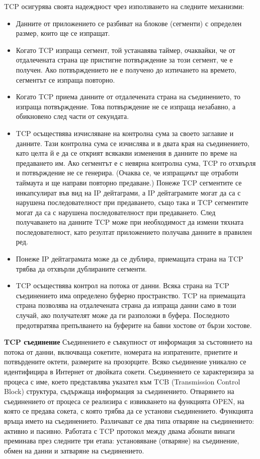 \documentclass{article}
\begin{document}
TCP осигурява своята надеждност чрез използването на следните механизми:
\begin{itemize}
    \item Данните от приложението се разбиват на блокове (сегменти) с определен размер, които ще се изпращат.
    \item Когато TCP изпраща сегмент, той устанавява таймер, очаквайки, че от отдалечената страна ще пристигне потвърждение за
    този сегмент, че е получен. Ако потвърждението не е получено до изтичането на времето, сегментът се изпраща повторно.
    \item Когато TCP приема данните от отдалечената страна на съединението, то изпраща потвърждение. Това потвърждение не се
    изпраща незабавно, а обикновено след части от секундата.
    \item TCP осъществява изчисляване на контролна сума за своето заглавие и данните. Тази контролна сума се изчислява и в двата
    края на съединението, като целта й е да се открият всякакви изменения в данните по време на предаването им. Ако сегментът е с
    невярна контролна сума, TCP го отхвърля и потвърждение не се генерира. (Очаква се, че изпращачът ще отработи таймаута и ще
    направи повторно предаване.) Понеже TCP сегментите се инкапсулират във вид на IP дейтаграми, а IP дейтаграмите могат да са с
    нарушена последователност при предаването, също така и TCP сегментите могат да са с нарушена последователност при предаването.
    След получаването на данните TCP може при необходимост да измени тяхната последователност, като резултат приложението получава
    данните в правилен ред.
    \item Понеже IP дейтаграмата може да се дублира, приемащата страна на TCP трябва да отхвърли дублираните сегменти.
    \item TCP осъществява контрол на потока от данни. Всяка страна на TCP съединението има определено буферно пространство. TCP
    на приемащата страна позволява на отдалечената страна да изпраща данни само в този случай, ако получателят може да ги
    разположи в буфера. Последното предотвратява препълването на буферите на бавни хостове от бързи хостове.
\end{itemize}
\textbf{TCP съединение} \newline\newline
Съединението е съвкупност от информация за състоянието на потока от данни, включваща сокетите, номерата на изпратените, приетите
и потвърдените октети, размерите на прозорците. Всяко съединение уникално се идентифицира в Интернет от двойката сокети.
Съединението се характеризира за процеса с име, което представлява указател към TCB (Transmission Control Block) структура,
съдържаща информация за съединението. Отварянето на съединението от процеса се реализира с извикването на функцията OPEN, на
която се предава сокета, с която трябва да се установи съединението. Функцията връща името на съединението. Различават се два
типа отваряне на съединението: активно и пасивно. Работата с TCP протокол между двама абонати винаги преминава през следните
три етапа: установяване (отваряне) на съединение, обмен на данни и затваряне на съединението.
\end{document}
